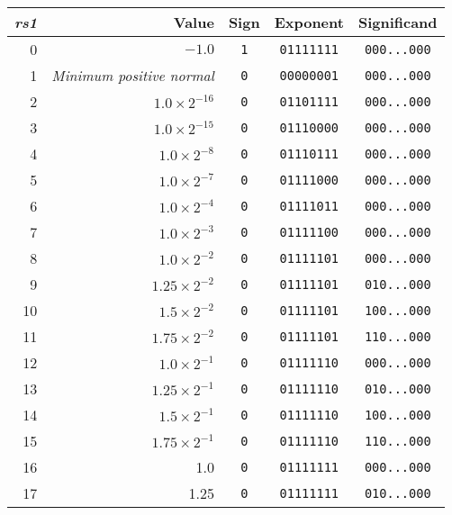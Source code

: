 \begin{table}[h]
\center
\begin{tabular}{|r|r|c|c|c|}
\hline
{\em rs1}   & Value                            & Sign    & Exponent       & Significand     \\
\hline
 0          & $-1.0$                           & {\tt 1} & {\tt 01111111} & {\tt 000...000} \\
 1          & {\em Minimum positive normal}    & {\tt 0} & {\tt 00000001} & {\tt 000...000} \\
 2          & $1.0 \times 2^{-16}$             & {\tt 0} & {\tt 01101111} & {\tt 000...000} \\
 3          & $1.0 \times 2^{-15}$             & {\tt 0} & {\tt 01110000} & {\tt 000...000} \\
 4          & $1.0 \times 2^{-8}$              & {\tt 0} & {\tt 01110111} & {\tt 000...000} \\
 5          & $1.0 \times 2^{-7}$              & {\tt 0} & {\tt 01111000} & {\tt 000...000} \\
 6          & $1.0 \times 2^{-4}$              & {\tt 0} & {\tt 01111011} & {\tt 000...000} \\
 7          & $1.0 \times 2^{-3}$              & {\tt 0} & {\tt 01111100} & {\tt 000...000} \\
 8          & $1.0 \times 2^{-2}$              & {\tt 0} & {\tt 01111101} & {\tt 000...000} \\
 9          & $1.25 \times 2^{-2}$             & {\tt 0} & {\tt 01111101} & {\tt 010...000} \\
10          & $1.5 \times 2^{-2}$              & {\tt 0} & {\tt 01111101} & {\tt 100...000} \\
11          & $1.75 \times 2^{-2}$             & {\tt 0} & {\tt 01111101} & {\tt 110...000} \\
12          & $1.0 \times 2^{-1}$              & {\tt 0} & {\tt 01111110} & {\tt 000...000} \\
13          & $1.25 \times 2^{-1}$             & {\tt 0} & {\tt 01111110} & {\tt 010...000} \\
14          & $1.5 \times 2^{-1}$              & {\tt 0} & {\tt 01111110} & {\tt 100...000} \\
15          & $1.75 \times 2^{-1}$             & {\tt 0} & {\tt 01111110} & {\tt 110...000} \\
16          & 1.0                              & {\tt 0} & {\tt 01111111} & {\tt 000...000} \\
17          & 1.25                             & {\tt 0} & {\tt 01111111} & {\tt 010...000} \\

\end{tabular}
\end{table}
